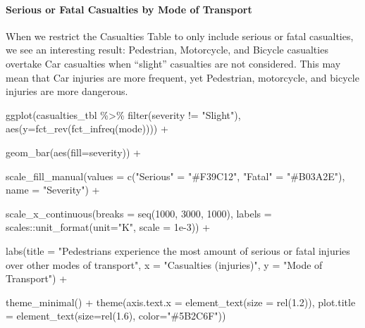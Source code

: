 \documentclass[
]{article}
\newenvironment{Shaded}{\begin{snugshade}}{\end{snugshade}}
\newcommand{\AttributeTok}[1]{\textcolor[rgb]{0.77,0.63,0.00}{#1}}
\newcommand{\DecValTok}[1]{\textcolor[rgb]{0.00,0.00,0.81}{#1}}
\newcommand{\FloatTok}[1]{\textcolor[rgb]{0.00,0.00,0.81}{#1}}
\newcommand{\FunctionTok}[1]{\textcolor[rgb]{0.00,0.00,0.00}{#1}}
\newcommand{\NormalTok}[1]{#1}
\newcommand{\OtherTok}[1]{\textcolor[rgb]{0.56,0.35,0.01}{#1}}
\newcommand{\SpecialCharTok}[1]{\textcolor[rgb]{0.00,0.00,0.00}{#1}}
\newcommand{\StringTok}[1]{\textcolor[rgb]{0.31,0.60,0.02}{#1}}
\begin{document}
\hypertarget{serious-or-fatal-casualties-by-mode-of-transport}{%
\paragraph{Serious or Fatal Casualties by Mode of
Transport}\label{serious-or-fatal-casualties-by-mode-of-transport}}

When we restrict the Casualties Table to only include serious or fatal
casualties, we see an interesting result: Pedestrian, Motorcycle, and
Bicycle casualties overtake Car casualties when ``slight'' casualties
are not considered. This may mean that Car injuries are more frequent,
yet Pedestrian, motorcycle, and bicycle injuries are more dangerous.

\begin{Shaded}
\begin{Highlighting}[]
\FunctionTok{ggplot}\NormalTok{(casualties\_tbl }\SpecialCharTok{\%\textgreater{}\%}
           \FunctionTok{filter}\NormalTok{(severity }\SpecialCharTok{!=} \StringTok{"Slight"}\NormalTok{), }
         \FunctionTok{aes}\NormalTok{(}\AttributeTok{y=}\FunctionTok{fct\_rev}\NormalTok{(}\FunctionTok{fct\_infreq}\NormalTok{(mode)))) }\SpecialCharTok{+}
    
    \FunctionTok{geom\_bar}\NormalTok{(}\FunctionTok{aes}\NormalTok{(}\AttributeTok{fill=}\NormalTok{severity)) }\SpecialCharTok{+}
    
    \FunctionTok{scale\_fill\_manual}\NormalTok{(}\AttributeTok{values =} \FunctionTok{c}\NormalTok{(}\StringTok{"Serious"} \OtherTok{=} \StringTok{"\#F39C12"}\NormalTok{, }
                                 \StringTok{"Fatal"} \OtherTok{=} \StringTok{"\#B03A2E"}\NormalTok{),}
                      \AttributeTok{name =} \StringTok{"Severity"}\NormalTok{) }\SpecialCharTok{+}
    
    \FunctionTok{scale\_x\_continuous}\NormalTok{(}\AttributeTok{breaks =} \FunctionTok{seq}\NormalTok{(}\DecValTok{1000}\NormalTok{, }\DecValTok{3000}\NormalTok{, }\DecValTok{1000}\NormalTok{),}
                       \AttributeTok{labels =}\NormalTok{ scales}\SpecialCharTok{::}\FunctionTok{unit\_format}\NormalTok{(}\AttributeTok{unit=}\StringTok{"K"}\NormalTok{, }\AttributeTok{scale =} \FloatTok{1e{-}3}\NormalTok{)) }\SpecialCharTok{+}
    
    \FunctionTok{labs}\NormalTok{(}\AttributeTok{title =} \StringTok{"Pedestrians experience the most amount of serious or fatal injuries over other modes of transport"}\NormalTok{,}
         \AttributeTok{x =} \StringTok{"Casualties (injuries)"}\NormalTok{,}
         \AttributeTok{y =} \StringTok{"Mode of Transport"}\NormalTok{) }\SpecialCharTok{+}
    
    \FunctionTok{theme\_minimal}\NormalTok{() }\SpecialCharTok{+}
    \FunctionTok{theme}\NormalTok{(}\AttributeTok{axis.text.x =} \FunctionTok{element\_text}\NormalTok{(}\AttributeTok{size =} \FunctionTok{rel}\NormalTok{(}\FloatTok{1.2}\NormalTok{)),}
          \AttributeTok{plot.title =} \FunctionTok{element\_text}\NormalTok{(}\AttributeTok{size=}\FunctionTok{rel}\NormalTok{(}\FloatTok{1.6}\NormalTok{), }\AttributeTok{color=}\StringTok{"\#5B2C6F"}\NormalTok{))}
\end{Highlighting}
\end{Shaded}
\end{document}
